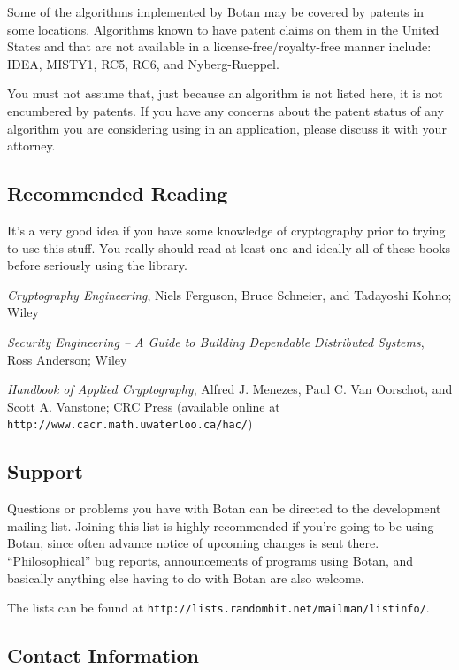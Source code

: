 \documentclass{article}
\newcommand{\url}[1]{\texttt{#1}}
\begin{document}
Some of the algorithms implemented by Botan may be covered by patents in some
locations. Algorithms known to have patent claims on them in the United States
and that are not available in a license-free/royalty-free manner include:
IDEA, MISTY1, RC5, RC6, and Nyberg-Rueppel.

You must not assume that, just because an algorithm is not listed here, it is
not encumbered by patents. If you have any concerns about the patent status of
any algorithm you are considering using in an application, please discuss it
with your attorney.

\subsection{Recommended Reading}

It's a very good idea if you have some knowledge of cryptography prior
to trying to use this stuff. You really should read at least one and
ideally all of these books before seriously using the library.

\setlength{\parskip}{5pt}

\noindent
\textit{Cryptography Engineering}, Niels Ferguson, Bruce Schneier, and
Tadayoshi Kohno; Wiley

\noindent
\textit{Security Engineering -- A Guide to Building Dependable
  Distributed Systems}, Ross Anderson; Wiley

\noindent
\textit{Handbook of Applied Cryptography}, Alfred J. Menezes,
Paul C. Van Oorschot, and Scott A. Vanstone; CRC Press (available
online at \url{http://www.cacr.math.uwaterloo.ca/hac/})

\subsection{Support}

Questions or problems you have with Botan can be directed to the
development mailing list. Joining this list is highly recommended if
you're going to be using Botan, since often advance notice of upcoming
changes is sent there. ``Philosophical'' bug reports, announcements of
programs using Botan, and basically anything else having to do with
Botan are also welcome.

The lists can be found at
\url{http://lists.randombit.net/mailman/listinfo/}.

\subsection{Contact Information}
\end{document}
